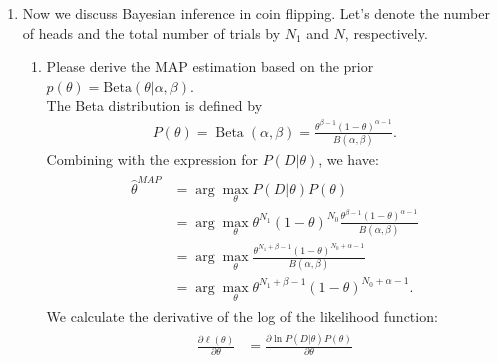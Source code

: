 \documentclass[10pt]{article}
\begin{document}
\begin{enumerate}[1.]
    \item Now we discuss Bayesian inference in coin flipping.
          Let's denote the number of heads and the total number of trials by $N_1$ and $N$, respectively.
          \begin{enumerate}
              \item Please derive the MAP estimation based on the prior $p(\theta) = \text{Beta}(\theta|\alpha, \beta)$.~ \\
                    { \color{blue}
                    The Beta distribution is defined by
                    \begin{align*}
                        P(\theta)=\operatorname{Beta}\left(\alpha, \beta\right)=\frac{\theta^{\beta-1}(1-\theta)^{\alpha-1}}{B\left(\alpha, \beta\right)}.
                    \end{align*}
                    Combining with the expression for $P(D|\theta)$, we have:
                    \begin{align*}
                        \begin{aligned}
                            \hat{\theta}^{M A P} & =\arg \max _{\theta} P(D | \theta) P(\theta)                                                                                \\
                                                 & =\arg \max _{\theta} \theta^{N_1}(1-\theta)^{N_0} \frac{\theta^{\beta-1}(1-\theta)^{\alpha-1}}{B\left(\alpha, \beta\right)} \\
                                                 & =\arg \max _{\theta} \frac{\theta^{N_1+\beta-1}(1-\theta)^{N_0+\alpha-1}}{B\left(\alpha, \beta\right)}                      \\
                                                 & =\arg \max _{\theta} \theta^{N_1+\beta-1}(1-\theta)^{N_0+\alpha-1}.
                        \end{aligned}
                    \end{align*}
                    We calculate the derivative of the log of the likelihood function:
                    \begin{align*}
                        \begin{aligned}
                            \frac{\partial \ell(\theta)}{\partial \theta} & =\frac{\partial \ln P(D | \theta)P(\theta)}{\partial \theta}                                                                                                                     \\

\end{aligned}
\end{align*}}
\end{enumerate}
\end{enumerate}
\end{document}
